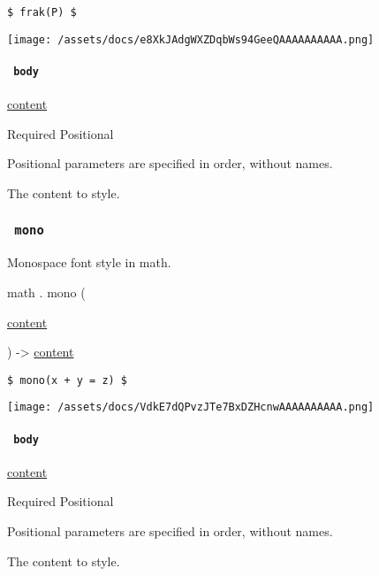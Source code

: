 \begin{verbatim}
$ frak(P) $
\end{verbatim}

\texttt{[image: /assets/docs/e8XkJAdgWXZDqbWs94GeeQAAAAAAAAAA.png]}

\paragraph{\texorpdfstring{\texttt{\ body\ }}{ body }}\label{functions-frak-body}

\href{/docs/reference/foundations/content/}{content}

{Required} {{ Positional }}

\label{functions-frak-body-positional-tooltip}
Positional parameters are specified in order, without names.

The content to style.

\subsubsection{\texorpdfstring{\texttt{\ mono\ }}{ mono }}\label{functions-mono}

Monospace font style in math.

math { . } { mono } (

{ \href{/docs/reference/foundations/content/}{content} }

) -\textgreater{} \href{/docs/reference/foundations/content/}{content}

\begin{verbatim}
$ mono(x + y = z) $
\end{verbatim}

\texttt{[image: /assets/docs/VdkE7dQPvzJTe7BxDZHcnwAAAAAAAAAA.png]}

\paragraph{\texorpdfstring{\texttt{\ body\ }}{ body }}\label{functions-mono-body}

\href{/docs/reference/foundations/content/}{content}

{Required} {{ Positional }}

\label{functions-mono-body-positional-tooltip}
Positional parameters are specified in order, without names.

The content to style.

